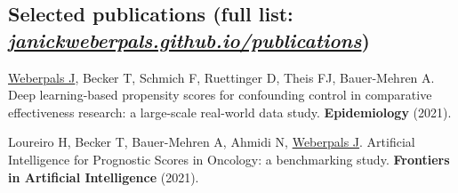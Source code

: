 \documentclass[letterpaper]{twentysecondcv} %
\begin{document}

\subsection{Selected publications \small(full list: \href{https://janickweberpals.github.io/publications}{\textit{janickweberpals.github.io/publications}})}


\underline{Weberpals J}, Becker T, Schmich F, Ruettinger D, Theis FJ, Bauer-Mehren A. Deep learning-based propensity scores for confounding control in comparative effectiveness research: a large-scale real-world data study. \textbf{Epidemiology} (2021).%

Loureiro H, Becker T, Bauer-Mehren A, Ahmidi N, \underline{Weberpals J}. Artificial Intelligence for Prognostic Scores in Oncology: a benchmarking study. \textbf{Frontiers in Artificial Intelligence} (2021). %





%
%
\end{document}
